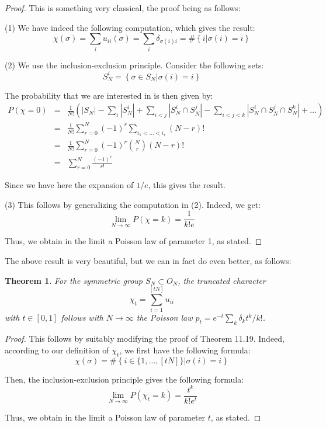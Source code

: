 \documentclass[12pt]{amsbook}
\newtheorem{theorem}{Theorem}[chapter]
\begin{document}
\begin{proof}
This is something very classical, the proof being as follows:

\medskip

(1) We have indeed the following computation, which gives the result:
$$\chi(\sigma)
=\sum_iu_{ii}(\sigma)
=\sum_i\delta_{\sigma(i)i}
=\#\left\{i\Big|\sigma(i)=i\right\}$$

(2) We use the inclusion-exclusion principle. Consider the following sets:
$$S_N^i=\left\{\sigma\in S_N\Big|\sigma(i)=i\right\}$$

The probability that we are interested in is then given by:
\begin{eqnarray*}
P(\chi=0)
&=&\frac{1}{N!}\left(|S_N|-\sum_i|S_N^i|+\sum_{i<j}|S_N^i\cap S_N^j|-\sum_{i<j<k}|S_N^i\cap S_N^j\cap S_N^k|+\ldots\right)\\
&=&\frac{1}{N!}\sum_{r=0}^N(-1)^r\sum_{i_1<\ldots<i_r}(N-r)!\\
&=&\frac{1}{N!}\sum_{r=0}^N(-1)^r\binom{N}{r}(N-r)!\\
&=&\sum_{r=0}^N\frac{(-1)^r}{r!}
\end{eqnarray*}

Since we have here the expansion of $1/e$, this gives the result.

\medskip

(3) This follows by generalizing the computation in (2). Indeed, we get:
$$\lim_{N\to\infty}P(\chi=k)=\frac{1}{k!e}$$

Thus, we obtain in the limit a Poisson law of parameter 1, as stated.
\end{proof}

The above result is very beautiful, but we can in fact do even better, as follows:


\begin{theorem}
For the symmetric group $S_N\subset O_N$, the truncated character
$$\chi_t=\sum_{i=1}^{[tN]}u_{ii}$$
with $t\in[0,1]$ follows with $N\to\infty$ the Poisson law $p_t=e^{-t}\sum_k\delta_kt^k/k!$.
\end{theorem}

\begin{proof}
This follows by suitably modifying the proof of Theorem 11.19. Indeed, according to our definition of $\chi_t$, we first have the following formula:
$$\chi(\sigma)=\#\left\{i\in\{1,\ldots,[tN]\}\Big|\sigma(i)=i\right\}$$

Then, the inclusion-exclusion principle gives the following formula:
$$\lim_{N\to\infty}P(\chi_t=k)=\frac{t^k}{k!e^t}$$

Thus, we obtain in the limit a Poisson law of parameter $t$, as stated.
\end{proof}
\end{document}
